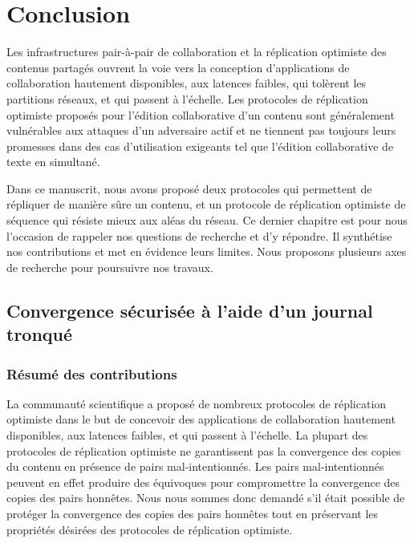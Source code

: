 
\chapter{Conclusion}\label{ch:conclusion}

\minitoc{}
\bigskip


Les infrastructures pair-à-pair de collaboration et la réplication optimiste des contenus partagés ouvrent la voie vers la conception d'applications de collaboration hautement disponibles, aux latences faibles, qui tolèrent les partitions réseaux, et qui passent à l'échelle.
Les protocoles de réplication optimiste proposés pour l'édition collaborative d'un contenu sont généralement vulnérables aux attaques d'un adversaire actif et ne tiennent pas toujours leurs promesses dans des cas d'utilisation exigeants tel que l'édition collaborative de texte en simultané.

Dans ce manuscrit, nous avons proposé deux protocoles qui permettent de répliquer de manière sûre un contenu, et un protocole de réplication optimiste de séquence qui résiste mieux aux aléas du réseau.
Ce dernier chapitre est pour nous l'occasion de rappeler nos questions de recherche et d'y répondre.
Il synthétise nos contributions et met en évidence leurs limites.
Nous proposons plusieurs axes de recherche pour poursuivre nos travaux.


\clearpage


\section{Convergence sécurisée à l'aide d'un journal tronqué}

\subsection{Résumé des contributions}

La communauté scientifique a proposé de nombreux protocoles de réplication optimiste dans le but de concevoir des applications de collaboration hautement disponibles, aux latences faibles, et qui passent à l'échelle.
La plupart des protocoles de réplication optimiste ne garantissent pas la convergence des copies du contenu en présence de pairs mal-intentionnés.
Les pairs mal-intentionnés peuvent en effet produire des équivoques pour compromettre la convergence des copies des pairs honnêtes.
Nous nous sommes donc demandé s'il était possible de protéger la convergence des copies des pairs honnêtes tout en préservant les propriétés désirées des protocoles de réplication optimiste.

